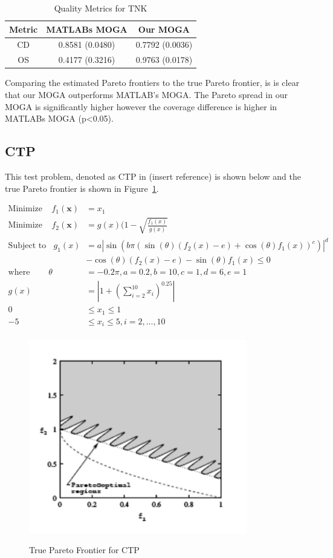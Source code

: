 \documentclass{article}
\begin{document}
\begin{table}[h]
\caption{Quality Metrics for TNK} 
\centering 
\begin{tabular}{|c|c|c|} 
\hline\hline  
Metric & MATLABs MOGA & Our MOGA \\ \hline
CD &  0.8581 (0.0480) & 0.7792 (0.0036) \\ \hline
OS & 0.4177 (0.3216) & 0.9763 (0.0178)\\ \hline
\end{tabular}
\label{tab:TNK} 
\end{table}
 
Comparing the estimated Pareto frontiers to the true Pareto frontier, is is clear that our MOGA outperforms MATLAB's MOGA. The Pareto spread in our MOGA is significantly higher however the coverage difference is higher in MATLABs MOGA (p<0.05).

\subsection{CTP} 
This test problem, denoted as CTP in (insert reference) is shown below and the true Pareto frontier is shown in Figure~\ref{fig:CTP_true}. 


\begin{align*}
\textrm{Minimize} ~~~~~ f_1(\textbf{x}) &= x_1 \\
\textrm{Minimize} ~~~~~ f_2(\textbf{x}) &= g(x)(1-\sqrt{\frac{f_1(x)}{g(x)}} \\
\textrm{Subject to} ~~~~ g_1(x) &= a|\sin(b\pi(\sin(\theta)(f_2(x)-e)+\cos(\theta)f_1(x))^c)|^d \\
&- \cos(\theta)(f_2(x)-e)-\sin(\theta)f_1(x) \leq 0 \\
\textrm{where} ~~~~~~~~~~ \theta &= -0.2\pi, a = 0.2, b=10, c=1, d=6, e = 1 \\
g(x) &= |1+(\sum_{i=2}^{10}x_i)^{0.25}| \\
0 &\leq  x_1  \leq 1 \\
-5 &\leq  x_i  \leq 5, i = 2,...,10 \\
\end{align*}
\begin{figure}[h]
  \caption{True Pareto Frontier for CTP}
  \centering
  \includegraphics[width=0.85\textwidth]{CTP_pareto_true.png}  
  \label{fig:CTP_true}
\end{figure}
\end{document}
